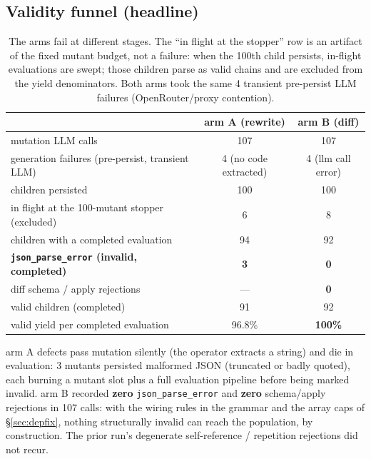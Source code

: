 \documentclass[11pt]{article}
\newcommand{\armA}{\textcolor{bad}{arm A}}
\newcommand{\armB}{\textcolor{accent}{arm B}}
\begin{document}
\subsection{Validity funnel (headline)}
\begin{table}[H]\centering
\begin{tabular}{lcc}
\toprule
 & \armA{} (rewrite) & \armB{} (diff) \\
\midrule
mutation LLM calls & 107 & 107 \\
generation failures (pre-persist, transient LLM) & 4 (no code extracted) & 4 (llm call error) \\
children persisted & 100 & 100 \\
in flight at the 100-mutant stopper (excluded) & 6 & 8 \\
children with a completed evaluation & 94 & 92 \\
\textbf{\texttt{json\_parse\_error} (invalid, completed)} & \textbf{\textcolor{bad}{3}} & \textbf{\textcolor{good}{0}} \\
diff schema / apply rejections & --- & \textbf{\textcolor{good}{0}} \\
valid children (completed) & 91 & 92 \\
valid yield per completed evaluation & 96.8\% & \textbf{100\%} \\
\bottomrule
\end{tabular}
\caption{The arms fail at different stages. The ``in flight at the stopper'' row is an
artifact of the fixed mutant budget, not a failure: when the 100th child persists, in-flight
evaluations are swept; those children parse as valid chains and are excluded from the yield
denominators. Both arms took the same 4 transient pre-persist LLM failures (OpenRouter/proxy
contention).}
\end{table}
\noindent
\armA{} defects pass mutation silently (the operator extracts a string) and die in
evaluation: 3 mutants persisted malformed JSON (truncated or badly quoted), each burning a
mutant slot plus a full evaluation pipeline before being marked invalid. \armB{} recorded
\textbf{zero} \texttt{json\_parse\_error} and \textbf{zero} schema/apply rejections in 107
calls: with the wiring rules in the grammar and the array caps of \S\ref{sec:depfix},
nothing structurally invalid can reach the population, by construction. The prior run's
degenerate self-reference / repetition rejections did not recur.
\end{document}
